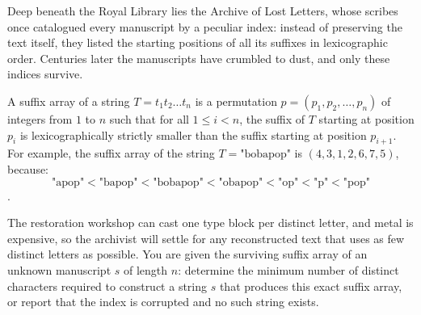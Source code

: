 Deep beneath the Royal Library lies the Archive of Lost Letters, whose scribes once catalogued every manuscript by a peculiar index: instead of preserving the text itself, they listed the starting positions of all its suffixes in lexicographic order. Centuries later the manuscripts have crumbled to dust, and only these indices survive.

A suffix array of a string $T = t_1 t_2 \dots t_n$ is a permutation $p = (p_1, p_2, \dots, p_n)$ of integers from $1$ to $n$ such that for all $1 \le i < n$, the suffix of $T$ starting at position $p_i$ is lexicographically strictly smaller than the suffix starting at position $p_{i+1}$.
For example, the suffix array of the string $T = \text{"bobapop"}$ is $(4, 3, 1, 2, 6, 7, 5)$, because:$$\text{"apop"} < \text{"bapop"} < \text{"bobapop"} < \text{"obapop"} < \text{"op"} < \text{"p"} < \text{"pop"}$$.

The restoration workshop can cast one type block per distinct letter, and metal is expensive, so the archivist will settle for any reconstructed text that uses as few distinct letters as possible. You are given the surviving suffix array of an unknown manuscript $s$ of length $n$: determine the minimum number of distinct characters required to construct a string $s$ that produces this exact suffix array, or report that the index is corrupted and no such string exists.
